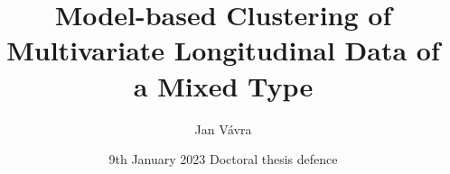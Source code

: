 \CZversionfalse      %


\usepackage{pgfpages}


\usepackage{animate}
\usepackage{tikz}
\usepackage{algpseudocode}
\usepackage{algorithmicx} %
\usepackage{algorithm}


\title[Model-based Clustering of Multivariate Longitudinal Data of a Mixed Type]{%
	Model-based Clustering of Multivariate Longitudinal Data of a Mixed Type}


\author[Jan Vávra]{%
	Jan Vávra}


\date[9.1.2023]{%
	9th January 2023 \qquad Doctoral thesis defence}

